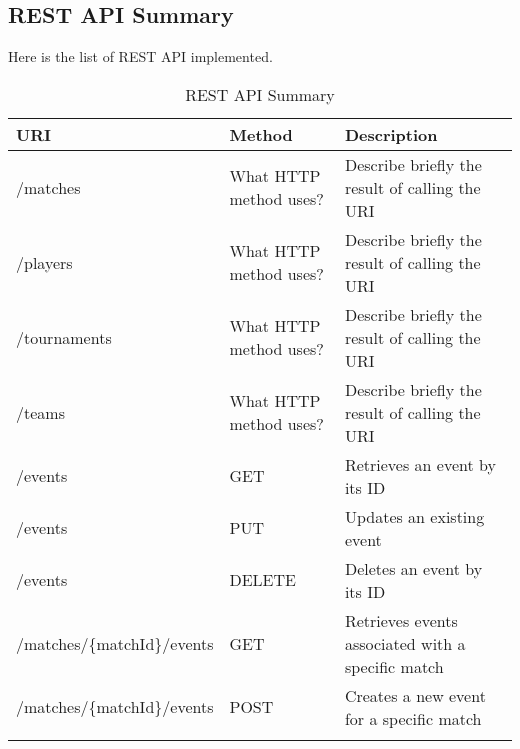 \subsection{REST API Summary}

Here is the list of REST API implemented.

\begin{longtable}{|p{}|p{} |p{}|} 
\hline
\textbf{URI} & \textbf{Method} & \textbf{Description}  \\\hline
/matches & What HTTP method uses? &  Describe briefly the result of calling the URI\\ \hline
/players & What HTTP method uses? &  Describe briefly the result of calling the URI\\ \hline
/tournaments & What HTTP method uses? &  Describe briefly the result of calling the URI\\ \hline
/teams & What HTTP method uses? &  Describe briefly the result of calling the URI\\ \hline
/events & GET &  Retrieves an event by its ID\\ \hline
/events & PUT &  Updates an existing event\\ \hline
/events & DELETE &  Deletes an event by its ID\\ \hline
/matches/\{matchId\}/events & GET &  Retrieves events associated with a specific match\\ \hline
/matches/\{matchId\}/events & POST &  Creates a new event for a specific match\\ \hline
\caption{REST API Summary}
\label{tab:termGlossary}
\end{longtable}